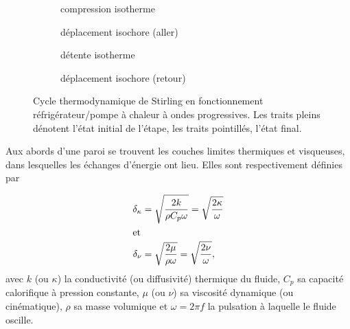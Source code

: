 \begin{figure}[!htp]
	\centering
	\begin{subfigure}{.47\textwidth}
		\centering
		
		\caption{compression isotherme}
		\label{fig:CycleStirling_Comp}
	\end{subfigure}
	\begin{subfigure}{.47\textwidth}
		\centering
		
		\caption{déplacement isochore (aller)}
		\label{fig:CycleStirling_DepIsoch1}
	\end{subfigure}
	
	\vspace{5mm}
	\begin{subfigure}{.47\textwidth}
		\centering
		
		\caption{détente isotherme}
		\label{fig:CycleStirling_Detente}
	\end{subfigure}
	\begin{subfigure}{.47\textwidth}
		\centering
		
		\caption{déplacement isochore (retour)}
		\label{fig:CycleStirling_DepIsoch2}
	\end{subfigure}	
	\caption[Cycle de Stirling des machines à ondes progressives]{Cycle thermodynamique de Stirling en fonctionnement réfrigérateur/pompe à chaleur à ondes progressives. Les traits pleins dénotent l'état initial de l'étape, les traits pointillés, l'état final.}
	\label{fig:CycleStirling}
\end{figure} %



Aux abords d'une paroi se trouvent les couches limites thermiques et visqueuses, dans lesquelles les échanges d'énergie ont lieu. Elles sont respectivement définies par

\begin{subequations}
	\begin{align}
		\delta_{\kappa} &= \sqrt{\frac{2 k}{\rho C_p \omega}} = \sqrt{\frac{2 \kappa}{\omega}}	\label{eq:CouchesLimites_Thermique}\\
		\intertext{et}
		\delta_{\nu} &= \sqrt{\frac{2 \mu}{\rho \omega}} = \sqrt{\frac{2 \nu}{\omega}},	\label{eq:CouchesLimites_Visqueuse}
	\end{align}
	\label{eq:CouchesLimites}%
\end{subequations}
avec $k$ (ou $\kappa$) la conductivité (ou diffusivité) thermique du fluide, $C_p$ sa capacité calorifique à pression constante, $\mu$ (ou $\nu$) sa viscosité dynamique (ou cinématique), $\rho$ sa masse volumique et $\omega = 2\pi f$ la pulsation à laquelle le fluide oscille.

